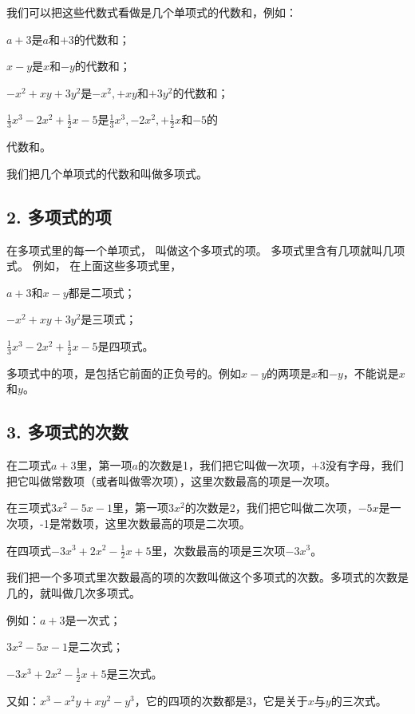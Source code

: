 我们可以把这些代数式看做是几个单项式的代数和，例如：

\(a + 3\)是\(a\)和\(+3\)的代数和；

\(x - y\)是\(x\)和\(-y\)的代数和；

\(-x^{2} + xy + 3y^{2}\)是\(-x^{2}, +xy\)和\(+3y^{2}\)的代数和；

\(\frac{1}{3} x^3 - 2x^2 + \frac{1}{2} x - 5\)是\(\frac{1}{3} x^3, -2x^2, +\frac{1}{2} x\)和\(-5\)的

代数和。

我们把几个单项式的代数和叫做多项式。

\subsection{2. 多项式的项}

在多项式里的每一个单项式， 叫做这个多项式的项。
多项式里含有几项就叫几项式。 例如， 在上面这些多项式里，

\(a + 3\)和\(x - y\)都是二项式；

\(-x^{2} + xy + 3y^{2}\)是三项式；

\(\frac{1}{3} x^3 - 2x^2 + \frac{1}{2} x - 5\)是四项式。

多项式中的项，是包括它前面的正负号的。例如\(x - y\)的两项是\(x\)和\(-y\)，不能说是\(x\)和\(y\)。

\subsection{3. 多项式的次数}

在二项式\(a + 3\)里，第一项\(a\)的次数是1，我们把它叫做一次项，\(+3\)没有字母，我们把它叫做常数项（或者叫做零次项），这里次数最高的项是一次项。

在三项式\(3x^{2} - 5x - 1\)里，第一项\(3x^{2}\)的次数是2，我们把它叫做二次项，\(-5x\)是一次项，-1是常数项，这里次数最高的项是二次项。

在四项式\(-3x^{3}+2x^{2}-\frac{1}{2}x+5\)里，次数最高的项是三次项\(-3x^{3}\)。

我们把一个多项式里次数最高的项的次数叫做这个多项式的次数。多项式的次数是几的，就叫做几次多项式。

例如：\(a + 3\)是一次式；

\(3x^{2}-5x-1\)是二次式；

\(-3x^{3} + 2x^{2} - \frac{1}{2} x + 5\)是三次式。

又如：\(x^{3} - x^{2}y + xy^{2} - y^{3}\)，它的四项的次数都是3，它是关于\(x\)与\(y\)的三次式。


